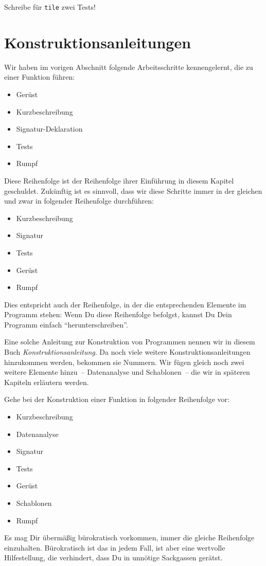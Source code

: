 \begin{aufgabe}
  Schreibe für \texttt{tile} zwei Tests!
\end{aufgabe}

\section{Konstruktionsanleitungen}
\label{sec:konstruktionsanleitungen}
%
Wir haben im vorigen Abschnitt folgende Arbeitsschritte kennengelernt,
die zu einer Funktion führen:
%
\begin{itemize}
\item Gerüst
\item Kurzbeschreibung
\item Signatur-Deklaration
\item Tests
\item Rumpf
\end{itemize}
%
Diese Reihenfolge ist der Reihenfolge ihrer Einführung in diesem
Kapitel geschuldet.  Zukünftig ist es sinnvoll, dass wir diese Schritte
immer in der gleichen und zwar in folgender Reihenfolge durchführen:
%
\begin{itemize}
\item Kurzbeschreibung
\item Signatur
\item Tests
\item Gerüst
\item Rumpf
\end{itemize}
%
Dies entspricht auch der Reihenfolge, in der die entsprechenden
Elemente im Programm stehen: Wenn Du diese Reihenfolge befolgst,
kannst Du Dein Programm einfach "`herunterschreiben"'.

Eine solche Anleitung zur Konstruktion von Programmen nennen wir in
diesem Buch
\textit{Konstruktionsanleitung}.  Da
noch viele weitere Konstruktionsanleitungen hinzukommen werden,
bekommen sie Nummern.  Wir fügen gleich noch zwei weitere Elemente
hinzu~-- Datenanalyse und Schablonen~-- die wir in späteren Kapiteln
erläutern werden.

\begin{konstruktionsanleitung}[Ablauf]
  Gehe bei der Konstruktion einer Funktion in folgender Reihenfolge
  vor:
  \begin{itemize}
    \item Kurzbeschreibung
    \item Datenanalyse
    \item Signatur
    \item Tests
    \item Gerüst
    \item Schablonen
    \item Rumpf
    \end{itemize}
\end{konstruktionsanleitung}
%
Es mag Dir übermäßig bürokratisch vorkommen, immer die gleiche
Reihenfolge einzuhalten.  Bürokratisch ist das in jedem Fall, ist aber
eine wertvolle Hilfestellung, die verhindert, dass Du in unnötige
Sackgassen gerätst.

